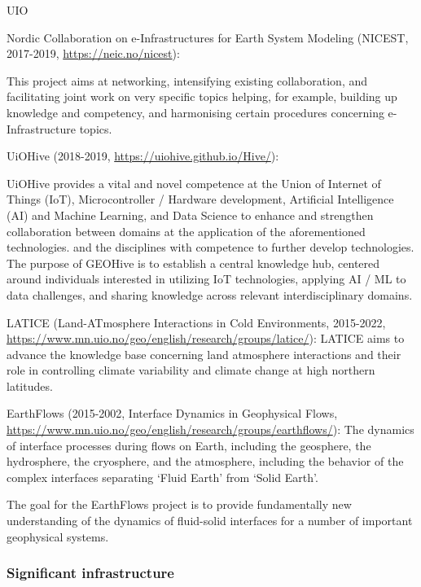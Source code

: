 \begin{sitedescription}{UIO}
\begin{compactenum}
\item Nordic Collaboration on e-Infrastructures for Earth System Modeling (NICEST, 2017-2019, \url{https://neic.no/nicest}):

This project aims at networking, intensifying existing collaboration, and facilitating 
joint work on very specific topics helping, for example, building up knowledge and
competency, and harmonising certain procedures concerning e-Infrastructure topics.

\item UiOHive (2018-2019, \url{https://uiohive.github.io/Hive/}): 

UiOHive provides a vital and novel competence at the Union of Internet of Things (IoT), Microcontroller / Hardware development, Artificial Intelligence (AI) and Machine Learning, and Data Science to enhance and strengthen collaboration between domains at the application of the aforementioned technologies. and the disciplines with competence to further develop technologies.
The purpose of GEOHive is to establish a central knowledge hub, centered around individuals interested in utilizing IoT technologies, applying AI / ML to data challenges, and sharing knowledge across relevant interdisciplinary domains.

\item LATICE (Land-ATmosphere Interactions in Cold Environments, 2015-2022, \url{https://www.mn.uio.no/geo/english/research/groups/latice/}): 
LATICE aims to advance the knowledge base concerning land atmosphere interactions and their role in controlling climate variability and climate change at high northern latitudes.

\item EarthFlows (2015-2002, Interface Dynamics in Geophysical Flows, \url{https://www.mn.uio.no/geo/english/research/groups/earthflows/}): 
The dynamics of interface processes during flows on Earth, including the geosphere, the hydrosphere, the cryosphere, and the atmosphere, including the behavior of the complex interfaces separating ‘Fluid Earth’ from ‘Solid Earth’.

The goal for the EarthFlows project is to provide fundamentally new understanding of the dynamics of fluid-solid interfaces for a number of important geophysical systems.

\end{compactenum}

\subsubsection*{Significant infrastructure}


\end{sitedescription}
